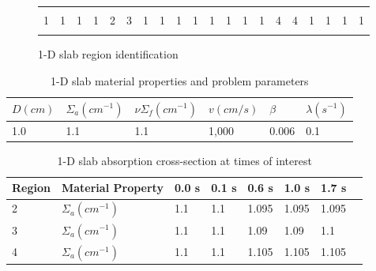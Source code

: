 \documentclass[12pt]{scrartcl}
\begin{document}
\begin{figure}[!htbp]
\begin{center}
\begin{tabular}{| l | l | l | l | l | l | l | l | l | l | l | l | l | l | l | l | l | l | l | l |}
\hline \hline \hline
  &   &   &   &   &   &    &    &   &   &   &   &   &   &   &   &   &   &   &   \\
1 & 1 & 1 & 1 & 2 & 3 & 1 & 1 & 1 & 1 & 1 & 1 & 1 & 1 & 4 & 4 & 1 & 1 & 1 & 1 \\
  &   &   &   &   &   &    &    &   &   &   &   &   &   &   &   &   &   &   &   \\
\hline \hline \hline
\end{tabular}
\caption{1-D slab region identification}
\label{fig:slab}
\end{center}
\end{figure}

\begin{table}[!htbp]
\begin{center}
\caption{1-D slab material properties and problem parameters}
\label{tab:1Dmat}
\begin{tabular}{llllll}
\hline
$D (cm)$ & $\Sigma_a (cm^{-1})$ & $\nu \Sigma_f (cm^{-1})$ & $v (cm/s)$ & $\beta$ & $\lambda (s^{-1})$ \\
\hline
1.0 & 1.1 & 1.1 & 1,000 & 0.006 & 0.1 \\

\hline
\end{tabular}
\end{center}
\end{table}

\begin{table}[!htbp]
\begin{center}
\caption{1-D slab absorption cross-section at times of interest}
\label{tab:1Dslope}
\begin{tabular}{llllllll}
\hline
Region & Material Property & 0.0 s & 0.1 s & 0.6 s & 1.0 s & 1.7 s \\
\hline
2 & $\Sigma_{a} (cm^{-1})$ & 1.1 & 1.1 & 1.095 & 1.095 & 1.095 \\
3 & $\Sigma_{a} (cm^{-1})$ & 1.1 & 1.1 & 1.09 & 1.09 & 1.1 \\
4 & $\Sigma_{a} (cm^{-1})$ & 1.1 & 1.1 & 1.105 & 1.105 & 1.105 \\
\hline
\end{tabular}
\end{center}
\end{table}
\end{document}

